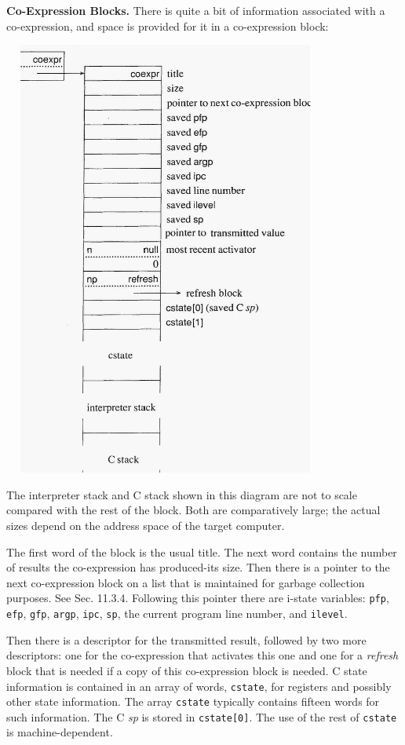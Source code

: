 \textbf{Co-Expression Blocks.} There is quite a bit of information
associated with a co-expression, and space is provided for it in a
co-expression block:


\bigskip

\clearpage
\ \  \includegraphics[width=3.9543in,height=5.678in]{ib-img/ib-img087.jpg} 


The interpreter stack and C stack shown in this diagram are not to
scale compared with the rest of the block. Both are comparatively
large; the actual sizes depend on the address space of the target
computer.


The first word of the block is the usual title. The next word contains
the number of results the co-expression has produced-its
{\textquotedbl}size.{\textquotedbl} Then there is a pointer to the
next co-expression block on a list that is maintained for garbage
collection purposes. See Sec. 11.3.4. Following this pointer there are
i-state variables: \texttt{pfp}, \texttt{efp}, \texttt{gfp},
\texttt{argp}, \texttt{ipc}, \texttt{sp}, the current program line
number, and \texttt{ilevel}.

Then there is a descriptor for the transmitted result, followed by two
more descriptors: one for the co-expression that activates this one
and one for a \textit{refresh} block that is needed if a copy of this
co-expression block is needed.  C state information is contained in an
array of words, \texttt{cstate}, for registers and possibly other
state information. The array \texttt{cstate} typically contains
fifteen words for such information. The C \textit{sp} is stored in
\texttt{cstate[0]}. The use of the rest of \texttt{cstate} is
machine-dependent.

